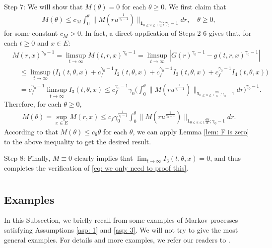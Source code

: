 \documentclass[12pt,a4paper]{amsart}
\theoremstyle{definition}
\numberwithin{equation}{section}
\begin{document}
Step 7: We will show that $M(\theta) = 0$ for each $\theta \geq 0$.
We first claim that
\begin{align}
	M(\theta)
	\leq c_M\int_0^\theta  \big\| M(r u^{\frac{1}{\gamma_0 - 1}}) \big\|_{\mathbf 1_{0\leq u\leq 1}\frac{du}{u};\gamma_0 - 1}  dr ,
	\quad \theta \geq 0,
\end{align}
for some constant $c_M > 0$.
In fact, a direct application of Steps 2-6 gives that, for each $t\geq 0$ and $x\in E$:
\begin{align}
	& M(r,x)^{\gamma_0 - 1}
	= \limsup_{t\to \infty} M(t,r,x)^{\gamma_0 - 1}
	= \limsup_{t\to \infty}|G(r)^{\gamma_0 - 1} - g(t,r,x)^{\gamma_0 - 1}|
	\\ & \quad \leq \limsup_{t\to \infty} \big( I_1(t,\theta,x) +c^{\gamma_0 - 1}_f I_2(t,\theta,x) +c^{\gamma_0 - 1}_f I_3(t,\theta,x) + c^{\gamma_0 - 1}_f I_4(t,\theta,x) \big)
	\\ & \quad = c_f^{\gamma_0 - 1} \limsup_{t\to \infty} I_3(t,\theta ,x)
       \leq c_f^{\gamma_0 - 1} \gamma_0 \Big(  \int_0^\theta  \big\| M(r u^{\frac{1}{\gamma_0 - 1}}) \big\|_{\mathbf 1_{0\leq u\leq 1}\frac{du}{u};\gamma_0 - 1}  dr\Big)^{\gamma_0 - 1}.
\end{align}
Therefore, for each $\theta \geq 0$,
\begin{align}
	M(\theta)
	= \sup_{x\in E}  M(r,x)
	\leq c_f \gamma_0^{\frac{1}{\gamma_0 - 1}} \int_0^\theta  \big\| M(r u^{\frac{1}{\gamma_0 - 1}}) \big\|_{\mathbf 1_{0\leq u\leq 1}\frac{du}{u};\gamma_0 - 1}  dr.
\end{align}
According to that $M(\theta) \leq c_6 \theta$ for each $\theta$, we can apply Lemma \ref{lem: F is zero} to the above inequality to get the desired result.


Step 8: Finally, $M \equiv 0$ clearly implies that $\lim_{t\to \infty} I_3(t,\theta, x) = 0$, and thus completes the verification of \eqref{eq: we only need to proof this}.


\appendix
\section{}
\subsection{Examples}
\label{sec:examples}

In this Subsection, we briefly recall from \cite{RenSongZhang2015Limit} some examples of Markov processes satisfying Assumptions \ref{asp: 1} and \ref{asp: 3}. We will not try to give the most
general examples. For details and more examples, we refer our readers to \cite{RenSongZhang2015Limit}.
\end{document}
